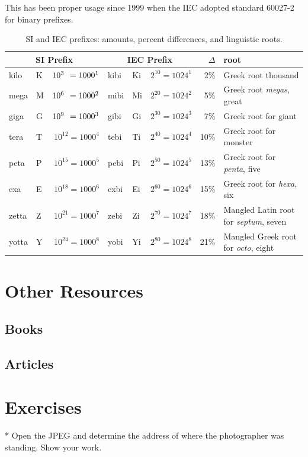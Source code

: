 This has been proper usage
since 1999 when the IEC adopted standard 60027-2 for binary prefixes.



\newcommand{\WZ}{{\color{white}0}}

\begin{table}
\begin{tabular}{||llr|llr|rl|}
\multicolumn{3}{c}{SI Prefix} & \multicolumn{3}{c}{IEC Prefix} & $\Delta$ & root \\ 
\hline
kilo  & K & $10^{3\WZ} = 1000^1 $ & kibi & Ki & $2^{10} = 1024^1 $& 2\% & Greek root {thousand} \\
\hline
mega  & M & $10^{6\WZ} = 1000^2 $ & mibi & Mi & $2^{20} = 1024^2 $& 5\% & Greek root \emph{megas}, {great}\\
\hline
giga  & G & $10^{9\WZ} = 1000^3 $ & gibi & Gi & $2^{30} = 1024^3 $& 7\% & Greek root for {giant}\\
\hline
tera  & T & $10^{12} = 1000^4$ & tebi & Ti & $2^{40} = 1024^4 $& 10\% & Greek root for {monster}\\
\hline
peta  & P & $10^{15} = 1000^5$ & pebi & Pi & $2^{50} = 1024^5 $& 13\% & Greek root for \emph{penta}, {five}\\
\hline
exa   & E & $10^{18} = 1000^6$ & exbi & Ei & $2^{60} = 1024^6 $& 15\% & Greek root for \emph{hexa}, {six}\\
\hline
zetta & Z & $10^{21} = 1000^7$ & zebi & Zi & $2^{70} = 1024^7 $& 18\% & Mangled Latin root for \emph{septum}, {seven}\\
\hline
yotta & Y & $10^{24} = 1000^8$ & yobi & Yi & $2^{80} = 1024^8 $& 21\% & Mangled Greek root for \emph{octo}, {eight}\\
\hline
\hline
\end{tabular}
\caption{SI and IEC prefixes: amounts, percent differences, and
  linguistic roots.}\label{si-iec-differences}
\end{table}

\section{Other Resources}
\subsection{Books}
\subsection{Articles}

\section{Exercises}
* Open the JPEG and determine the address of where the photographer
was standing. Show your work.



